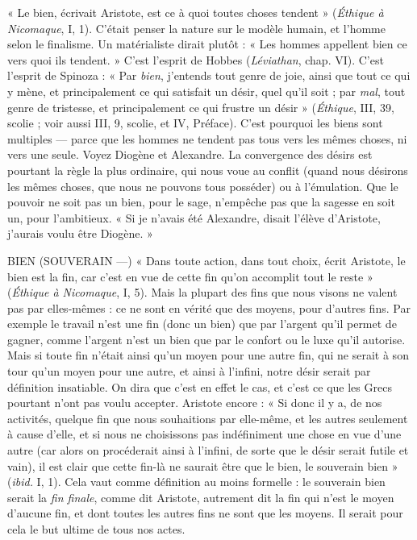 « Le bien, écrivait Aristote, est ce à quoi toutes choses tendent » ({\it Éthique à
Nicomaque}, I, 1). C'était penser la nature sur le modèle humain, et l’homme
selon le finalisme. Un matérialiste dirait plutôt : « Les hommes appellent bien
ce vers quoi ils tendent. » C’est l’esprit de Hobbes ({\it Léviathan}, chap. VI). C’est
l'esprit de Spinoza : « Par {\it bien}, j'entends tout genre de joie, ainsi que tout ce
qui y mène, et principalement ce qui satisfait un désir, quel qu’il soit ; par {\it mal},
tout genre de tristesse, et principalement ce qui frustre un désir » ({\it Éthique}, III,
39, scolie ; voir aussi III, 9, scolie, et IV, Préface). C’est pourquoi les biens sont
multiples — parce que les hommes ne tendent pas tous vers les mêmes choses,
ni vers une seule. Voyez Diogène et Alexandre. La convergence des désirs est
pourtant la règle la plus ordinaire, qui nous voue au conflit (quand nous désirons
les mêmes choses, que nous ne pouvons tous posséder) ou à l’émulation.
Que le pouvoir ne soit pas un bien, pour le sage, n'empêche pas que la sagesse
en soit un, pour l’ambitieux. « Si je n’avais été Alexandre, disait l'élève d’Aristote,
j'aurais voulu être Diogène. »

BIEN (SOUVERAIN —) « Dans toute action, dans tout choix, écrit Aristote,
le bien est la fin, car c’est en vue de cette fin qu’on
accomplit tout le reste » ({\it Éthique à Nicomaque}, I, 5). Mais la plupart des fins
que nous visons ne valent pas par elles-mêmes : ce ne sont en vérité que des
moyens, pour d’autres fins. Par exemple le travail n’est une fin (donc un bien)
que par l’argent qu’il permet de gagner, comme l'argent n’est un bien que par
le confort ou le luxe qu’il autorise. Mais si toute fin n’était ainsi qu’un moyen
pour une autre fin, qui ne serait à son tour qu’un moyen pour une autre, et
ainsi à l'infini, notre désir serait par définition insatiable. On dira que c’est en
effet le cas, et c’est ce que les Grecs pourtant n’ont pas voulu accepter. Aristote
encore : « Si donc il y a, de nos activités, quelque fin que nous souhaitions par
elle-même, et les autres seulement à cause d’elle, et si nous ne choisissons pas
indéfiniment une chose en vue d’une autre (car alors on procéderait ainsi à
l'infini, de sorte que le désir serait futile et vain), il est clair que cette fin-là ne
saurait être que le bien, le souverain bien » ({\it ibid.} I, 1). Cela vaut comme définition
au moins formelle : le souverain bien serait la {\it fin finale}, comme dit Aristote,
autrement dit la fin qui n’est le moyen d’aucune fin, et dont toutes les
autres fins ne sont que les moyens. Il serait pour cela le but ultime de tous nos
actes.

